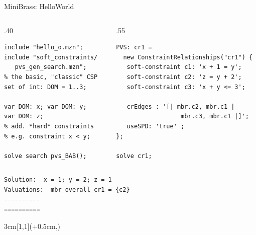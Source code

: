 \begin{frame}[fragile]{MiniBrass: HelloWorld}
\begin{columns}[onlytextwidth,T]
    
    \begin{column}{.40\textwidth}
          
    \begin{lstlisting}
include "hello_o.mzn"; 
include "soft_constraints/
   pvs_gen_search.mzn"; 
% the basic, "classic" CSP 
set of int: DOM = 1..3;

var DOM: x; var DOM: y; 
var DOM: z;
% add. *hard* constraints
% e.g. constraint x < y;

solve search pvs_BAB();
\end{lstlisting}
    \end{column}
    
    \begin{column}{.55\textwidth}
  	\begin{lstlisting}
PVS: cr1 = 
  new ConstraintRelationships("cr1") {
   soft-constraint c1: 'x + 1 = y';
   soft-constraint c2: 'z = y + 2';
   soft-constraint c3: 'x + y <= 3';
   
   crEdges : '[| mbr.c2, mbr.c1 | 
                  mbr.c3, mbr.c1 |]';
   useSPD: 'true' ;
}; 

solve cr1;
\end{lstlisting}

    \end{column}
  \end{columns}
  \pause
  \begin{verbatim}
Solution:  x = 1; y = 2; z = 1
Valuations:  mbr_overall_cr1 = {c2}
----------
==========
  \end{verbatim}
  \begin{textblock*}{3cm}[1,1](\textwidth+0.5cm,\textheight-0.3cm)
\begin{center}
\end{center}
\end{textblock*}
\end{frame}


